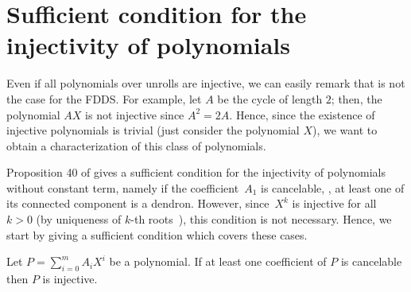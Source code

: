 \section{Sufficient condition for the injectivity of polynomials}\label{section:cond_suf_poly_FDDS_inj}

	Even if all polynomials over unrolls are injective, we can easily remark that is not the case for the FDDS.
	For example, let $A$ be the cycle of length $2$; then, the polynomial $AX$ is not injective since $A^2=2A$.
	Hence, since the existence of injective polynomials is trivial (just consider the polynomial $X$), we want to obtain a characterization of this class of polynomials. 
	
	Proposition 40 of \cite{article_arbre} gives a sufficient condition for the injectivity of polynomials without constant term, namely if the coefficient~$A_1$ is cancelable, \ie, at least one of its connected component is a dendron.
	However, since~$X^k$ is injective for all~$k>0$ (by uniqueness of $k$-th roots~\cite{article_arbre}), this condition is not necessary. 
	Hence, we start by giving a sufficient condition which covers these cases.
	
	\begin{proposition}\label{prop:condSufInj}
		Let $P = \sum_{i=0}^{m} A_i X^{i}$ be a polynomial.
		If at least one coefficient of $P$ is cancelable then $P$ is injective.
	\end{proposition}
	
	
	
